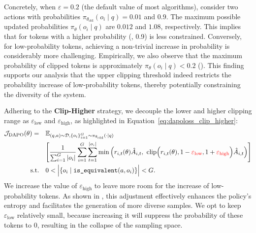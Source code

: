 Concretely, when $\varepsilon = 0.2$ (the default value of most algorithms), consider two actions with probabilities $\pi_{\theta_{\text{old}}}(o_i \mid q) = 0.01$ and $0.9$. The maximum possible updated probabilities $\pi_{\theta}(o_i \mid q)$ are $0.012$ and $1.08$, respectively. 
This implies that for tokens with a higher probability (\eg, 0.9) is less constrained. Conversely, for low-probability tokens, achieving a non-trivial increase in probability is considerably more challenging.
Empirically, we also observe that the maximum probability of clipped tokens is approximately $\pi_{\theta}(o_i \mid q) < 0.2$ (). This finding supports our analysis that the upper clipping threshold indeed restricts the probability increase of low-probability tokens, thereby potentially constraining the diversity of the system.

Adhering to the \textbf{Clip-Higher} strategy, we decouple the lower and higher clipping range as $\varepsilon_\text{low}$ and $\varepsilon_\text{high}$, as highlighted in Equation~\ref{eq:dapoloss_clip_higher}:
\begin{equation}
\begin{aligned}
\mathcal{J}_{\text{DAPO}}(\theta) = \quad&\mathbb{E}_{(q,a)\sim\mathcal{D}, \{o_i\}_{i=1}^G\sim \pi_{\theta_\text{old}}(\cdot\mid q)}\\&
\Bigg[\frac{1}{\sum_{i=1}^{G}|o_i|}\sum_{i=1}^{G}\sum_{t=1}^{|o_i|} 
\min \Big( r_{i,t}(\theta) \hat{A}_{i,t},  
\ \text{clip} \Big( r_{i,t}(\theta), 1 - {\color{red}\varepsilon_{\text{low}}}, 1 + {\color{red}\varepsilon_{\text{high}}} \Big) \hat{A}_{i,t} \Big) \Bigg]\\
\text{s.t.}\quad& 0< \Big|\{o_i\mid\texttt{is\_equivalent}(a,o_i)\}\Big|< G.
\label{eq:dapoloss_clip_higher}
\end{aligned}
\end{equation}
We increase the value of \( \varepsilon_{\text{high}} \) to leave more room for the increase of low-probability tokens. As shown in , this adjustment effectively enhances the policy's entropy and facilitates the generation of more diverse samples.
We opt to keep \( \varepsilon_{\text{low}} \) relatively small, because increasing it will suppress the probability of these tokens to $0$, resulting in the collapse of the sampling space.


